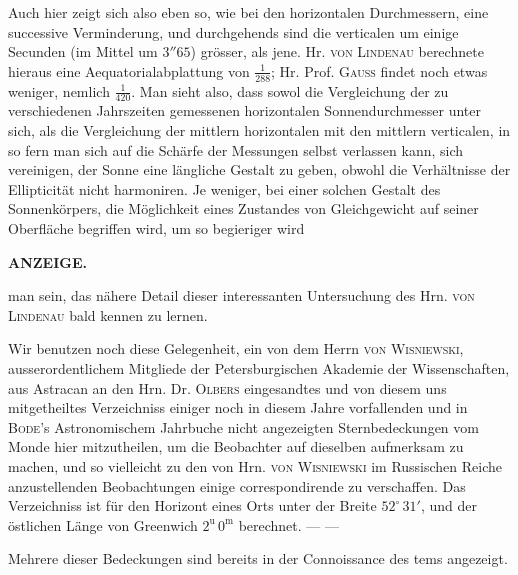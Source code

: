 Auch hier zeigt sich also eben so, wie bei den horizontalen Durchmessern, eine successive Verminderung, und durchgehends sind die verticalen um einige Secunden (im Mittel um $3''65$) grösser, als jene. Hr. \textsc{von Lindenau} berechnete hieraus eine Aequatorialabplattung von $\tfrac{1}{288}$; Hr. Prof. \textsc{Gauss} findet noch etwas weniger, nemlich $\tfrac{1}{420}$. Man sieht also, dass sowol die Vergleichung der zu verschiedenen Jahrszeiten gemessenen horizontalen Sonnendurchmesser unter sich, als die Vergleichung der mittlern horizontalen mit den mittlern verticalen, in so fern man sich auf die Schärfe der Messungen selbst verlassen kann, sich vereinigen, der Sonne eine längliche Gestalt zu geben, obwohl die Verhältnisse der Ellipticität nicht harmoniren. Je weniger, bei einer solchen Gestalt des Sonnenkörpers, die Möglichkeit eines Zustandes von Gleichgewicht auf seiner Oberfläche begriffen wird, um so begieriger wird\par
\clearpage
\noindent{}%
%
\parbox[t]{\dimexpr\linewidth-24mm\relax}{\centering\footnotesize\bfseries ANZEIGE.\par}%
\makebox[12mm][r]{}\par\nobreak\medskip
\noindent man sein, das nähere Detail dieser interessanten Untersuchung des Hrn. \textsc{von Lindenau} bald kennen zu lernen.

Wir benutzen noch diese Gelegenheit, ein von dem Herrn \textsc{von Wisniewski}, ausserordentlichem Mitgliede der Petersburgischen Akademie der Wissenschaften, aus Astracan an den Hrn. Dr. \textsc{Olbers} eingesandtes und von diesem uns mitgetheiltes Verzeichniss einiger noch in diesem Jahre vorfallenden und in \textsc{Bode}'s Astronomischem Jahrbuche nicht angezeigten Sternbedeckungen vom Monde hier mitzutheilen, um die Beobachter auf dieselben aufmerksam zu machen, und so vielleicht zu den von Hrn. \textsc{von Wisniewski} im Russischen Reiche anzustellenden Beobachtungen einige correspondirende zu verschaffen. Das Verzeichniss ist für den Horizont eines Orts unter der Breite $52^{\circ}\,31'$, und der östlichen Länge von Greenwich $2^{\mathrm u}\,0^{\mathrm m}$ berechnet. — —

Mehrere dieser Bedeckungen sind bereits in der Connoissance des tems angezeigt.
